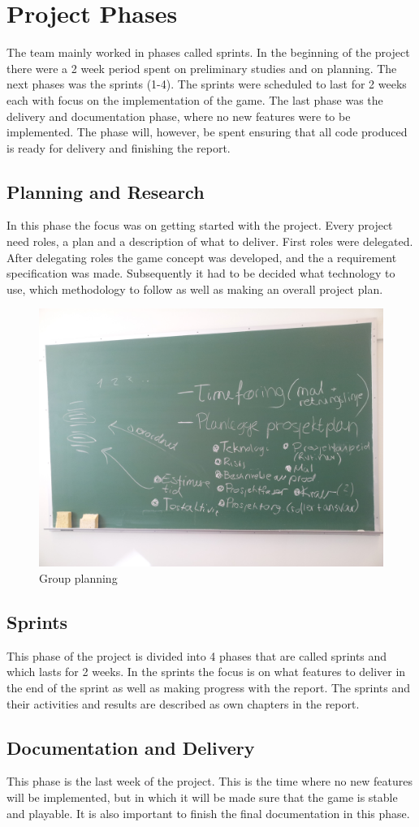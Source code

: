 \clearpage
\section{Project Phases}

The team mainly worked in phases called sprints. In the beginning of the project there were a 2 week period spent on preliminary studies and on planning. The next phases was the sprints (1-4). The sprints were scheduled to last for 2 weeks each with focus on the implementation of the game. The last phase was the delivery and documentation phase, where no new features were to be implemented. The phase will, however, be spent ensuring that all code produced is ready for delivery and finishing the report.

\subsection{Planning and Research}
In this phase the focus was on getting started with the project. Every project need roles, a plan and a description of what to deliver. First roles were delegated. After delegating roles the game concept was developed, and the a requirement specification was made. Subsequently it had to be decided what technology to use, which methodology to follow as well as making an overall project plan. 

	\begin{figure}[H]
		\includegraphics[scale=0.10]{pictures/projectPlanning.jpg}
		\caption{Group planning}
	\end{figure}

\subsection{Sprints}
This phase of the project is divided into 4 phases that are called sprints and which lasts for 2 weeks. In the sprints the focus is on what features to deliver in the end of the sprint as well as making progress with the report. The sprints and their activities and results are described as own chapters in the report.

\subsection{Documentation and Delivery}
This phase is the last week of the project. This is the time where no new features will be implemented, but in which it will be made sure that the game is stable and playable. It is also important to finish the final documentation in this phase.
